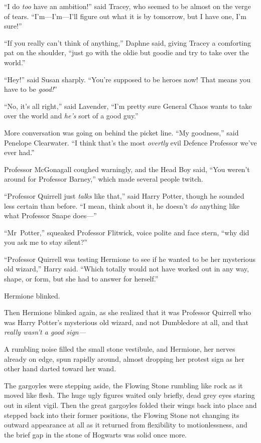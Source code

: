 “I do \emph{too} have an ambition!” said Tracey, who seemed to be almost on the verge of tears. “I’m—I’m—I’ll figure out what it is by tomorrow, but I have one, I’m sure!”

“If you really can’t think of anything,” Daphne said, giving Tracey a comforting pat on the shoulder, “just go with the oldie but goodie and try to take over the world.”

“Hey!” said Susan sharply. “You’re supposed to be heroes now! That means you have to be \emph{good!}”

“No, it’s all right,” said Lavender, “I’m pretty sure General Chaos wants to take over the world and \emph{he’s} sort of a good guy.”

More conversation was going on behind the picket line. “My goodness,” said Penelope Clearwater. “I think that’s the most \emph{overtly} evil Defence Professor we’ve ever had.”

Professor McGonagall coughed warningly, and the Head Boy said, “You weren’t around for Professor Barney,” which made several people twitch.

“Professor Quirrell just \emph{talks} like that,” said Harry Potter, though he sounded less certain than before. “I mean, think about it, he doesn’t \emph{do} anything like what Professor Snape does—”

“Mr~Potter,” squeaked Professor Flitwick, voice polite and face stern, “why did you ask me to stay silent?”

“Professor Quirrell was testing Hermione to see if he wanted to be her mysterious old wizard,” Harry said. “Which totally would not have worked out in any way, shape, or form, but she had to answer for herself.”

Hermione blinked.

Then Hermione blinked again, as she realized that it was Professor Quirrell who was Harry Potter’s mysterious old wizard, and not Dumbledore at all, and that \emph{really wasn’t a good sign—}

A rumbling noise filled the small stone vestibule, and Hermione, her nerves already on edge, spun rapidly around, almost dropping her protest sign as her other hand darted toward her wand.

The gargoyles were stepping aside, the Flowing Stone rumbling like rock as it moved like flesh. The huge ugly figures waited only briefly, dead grey eyes staring out in silent vigil. Then the great gargoyles folded their wings back into place and stepped back into their former positions, the Flowing Stone not changing its outward appearance at all as it returned from flexibility to motionlessness, and the brief gap in the stone of Hogwarts was solid once more.

